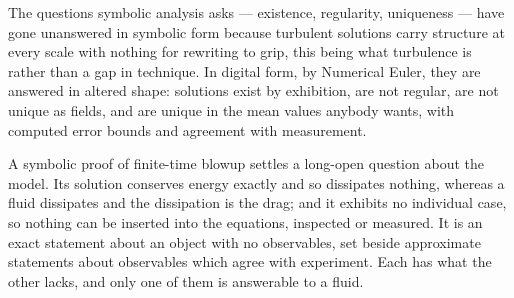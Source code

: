\documentclass[11pt]{article}
\begin{document}
The questions symbolic analysis asks --- existence, regularity, uniqueness --- have gone unanswered
in symbolic form because turbulent solutions carry structure at every scale with nothing for
rewriting to grip, this being what turbulence is rather than a gap in technique. In digital form, by
Numerical Euler, they are answered in altered shape: solutions exist by exhibition, are not regular,
are not unique as fields, and are unique in the mean values anybody wants, with computed error bounds
and agreement with measurement.

A symbolic proof of finite-time blowup settles a long-open question about the model. Its solution
conserves energy exactly and so dissipates nothing, whereas a fluid dissipates and the dissipation is
the drag; and it exhibits no individual case, so nothing can be inserted into the equations,
inspected or measured. It is an exact statement about an object with no observables, set beside
approximate statements about observables which agree with experiment. Each has what the other lacks,
and only one of them is answerable to a fluid.
\end{document}
